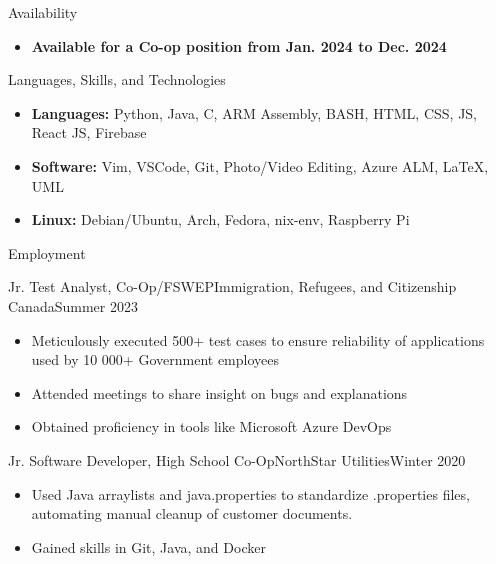 \documentclass[]{mcdowellcv}
\begin{document}
	\makeheader

	\begin{cvsection}{Availability}
		\begin{cvsubsection}{}{}{}
			\begin{itemize}
				\item \textbf{Available for a Co-op position from Jan. 2024 to Dec. 2024}
			\end{itemize}
		\end{cvsubsection}
	\end{cvsection}

	\begin{cvsection}{Languages, Skills, and Technologies}
		\begin{cvsubsection}{}{}{}	
			\begin{itemize}
					\item \textbf{Languages:} Python, Java, C, ARM Assembly, BASH, HTML, CSS, JS, React JS, Firebase
					\item \textbf{Software:} Vim, VSCode, Git, Photo/Video Editing, Azure ALM, \LaTeX, UML
					\item \textbf{Linux:} Debian/Ubuntu, Arch, Fedora, nix-env, Raspberry Pi 
			\end{itemize}
		\end{cvsubsection}
	\end{cvsection}

	\begin{cvsection}{Employment}
		\begin{cvsubsection}{Jr. Test Analyst, Co-Op/FSWEP}{Immigration, Refugees, and Citizenship Canada}{Summer 2023}			
			\begin{itemize}
				\item Meticulously executed 500+ test cases to ensure reliability of applications used by 10 000+ Government employees
				\item Attended meetings to share insight on bugs and explanations 
				\item Obtained proficiency in tools like Microsoft Azure DevOps 
			\end{itemize}
		\end{cvsubsection}
		
			\begin{cvsubsection}{Jr. Software Developer, High School Co-Op}{NorthStar Utilities}{Winter 2020}	
			\begin{itemize}
				\item Used Java arraylists and java.properties to standardize .properties files, automating manual cleanup of customer documents.
				\item Gained skills in Git, Java, and Docker
			\end{itemize}
		\end{cvsubsection}
	\end{cvsection}
\end{document}
